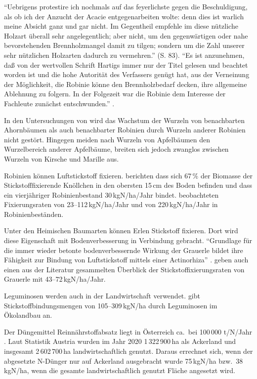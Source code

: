 \documentclass[twocolumn]{scrartcl}
\begin{document}
\enquote{Uebrigens protestire ich nochmals auf das feyerlichste gegen
  die Beschuldigung, als ob ich der Anzucht der Acacie
  entgegenarbeiten wolte: denn dies ist warlich meine Absicht ganz und
  gar nicht. Im Gegentheil empfehle im diese nützliche Holzart
  überall sehr angelegentlich; aber nicht, um den gegenwärtigen oder
  nahe bevorstehenden Brennholzmangel damit zu tilgen; sondern um die
  Zahl unserer sehr nützlichen Holzarten dadurch zu vermehren.}
(S. 83).
\enquote{Es ist anzunehmen, daß von der wertvollen Schrift Hartigs
  immer nur der Titel gelesen und beachtet worden ist und die hohe
  Autorität des Verfassers genügt hat, aus der Verneinung der
  Möglichkeit, die Robinie könne den Brennholzbedarf decken, ihre
  allgemeine Ablehnung zu folgern. In der Folgezeit war die Robinie
  dem Interesse der Fachleute zunächst entschwunden.}
\citep{erteld1952robinieErtrag}.

In den Untersuchungen von
\citet[S.~150--160]{scamoni1952robinieWurzeln} wird das Wachstum der
Wurzeln von benachbarten Ahornbäumen als auch benachbarter Robinien
durch Wurzeln anderer Robinien nicht gestört. Hingegen meiden nach
\citet[S.~53]{kolesnikov1971wurzeln} Wurzeln von Apfelbäumen den
Wurzelbereich anderer Apfelbäume, breiten sich jedoch zwanglos
zwischen Wurzeln von Kirsche und Marille aus.

Robinien können Luftstickstoff fixieren.
\citet{boring1984robinieN} berichten dass sich 67\,\% der Biomasse der
Stickstofffixierende Knöllchen in den obersten 15\,cm des Boden befinden
und dass ein vierjähriger Robinienbestand 30\,kgN/ha/Jahr bindet.
\citet{noh2009robinieN} beobachteten
Fixierungsraten von 23--112\,kgN/ha/Jahr und \citet{danso1995robinieN}
von 220\,kgN/ha/Jahr in Robinienbeständen.

Unter den Heimischen Baumarten können Erlen Stickstoff fixieren. Dort
wird diese Eigenschaft mit Bodenverbesserung in Verbindung
gebracht. \enquote{Grundlage für die immer wieder betonte bodenverbessernde
Wirkung der Grauerle bildet ihre Fähigkeit zur Bindung von
Luftstickstoff mittels einer Actinorhiza}
\citep{schuett2014alnusIncarna}. \citet{schuett2014alnusIncarna} geben
auch einen aus der Literatur gesammelten Überblick der
Stickstoffixierungsraten von Grauerle mit 43--72\,kgN/ha/Jahr.

Leguminosen werden auch in der Landwirtschaft verwendet.
\citet{kolbe2008stickstoff} gibt Stickstoffbindungsmengen von
105--309\,kgN/ha durch Leguminosen im Ökolandbau an.

Der Düngemittel Reinnährstoffabsatz liegt in Österreich ca.\ bei 100\,000
t/N/Jahr \citep{ama2024duengemittel}. Laut Statistik Austria wurden im Jahr 2020
1\,322\,900\,ha als Ackerland und insgesamt 2\,602\,700\,ha landwirtschaftlich
genutzt. Daraus errechnet sich, wenn der abgesetzte N-Dünger nur auf Ackerland
ausgebracht wurde 75\,kgN/ha bzw.\ 38\,kgN/ha, wenn die gesamte
landwirtschaftlich genutzt Fläche angesetzt wird.
\end{document}

